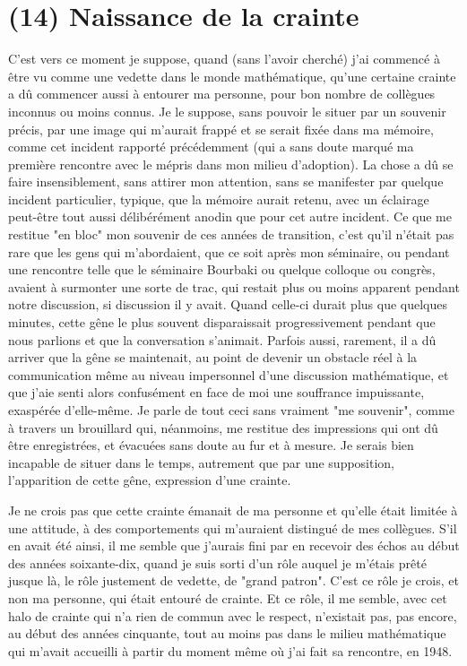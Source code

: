 \section{(14) Naissance de la crainte}

C'est vers ce moment je suppose, quand (sans l'avoir cherché) j'ai commencé à être vu comme une vedette dans le monde mathématique, qu'une certaine crainte a dû commencer aussi à entourer ma personne, pour bon nombre de collègues inconnus ou moins connus. Je le suppose, sans pouvoir le situer par un souvenir précis, par une image qui m'aurait frappé et se serait fixée dans ma mémoire, comme cet incident rapporté précédemment (qui a sans doute marqué ma première rencontre avec le mépris dans mon milieu d'adoption). La chose a dû se faire insensiblement, sans attirer mon attention, sans se manifester par quelque incident particulier, typique, que la mémoire aurait retenu, avec un éclairage peut-être tout aussi délibérément anodin que pour cet autre incident. Ce que me restitue "en bloc" mon souvenir de ces années de transition, c'est qu'il n'était pas rare que les gens qui m'abordaient, que ce soit après mon séminaire, ou pendant une rencontre telle que le séminaire Bourbaki ou quelque colloque ou congrès, avaient à surmonter une sorte de trac, qui restait plus ou moins apparent pendant notre discussion, si discussion il y avait. Quand celle-ci durait plus que quelques minutes, cette gêne le plus souvent disparaissait progressivement pendant que nous parlions et que la conversation s'animait. Parfois aussi, rarement, il a dû arriver que la gêne se maintenait, au point de devenir un obstacle réel à la communication même au niveau impersonnel d'une discussion mathématique, et que j'aie senti alors confusément en face de moi une souffrance impuissante, exaspérée d'elle-même. Je parle de tout ceci sans vraiment "me souvenir", comme à travers un brouillard qui, néanmoins, me restitue des impressions qui ont dû être enregistrées, et évacuées sans doute au fur et à mesure. Je serais bien incapable de situer dans le temps, autrement que par une supposition, l'apparition de cette gêne, expression d'une crainte.

Je ne crois pas que cette crainte émanait de ma personne et qu'elle était limitée à une attitude, à des comportements qui m'auraient distingué de mes collègues. S'il en avait été ainsi, il me semble que j'aurais fini par en recevoir des échos au début des années soixante-dix, quand je suis sorti d'un rôle auquel je m'étais prêté jusque là, le rôle justement de vedette, de "grand patron". C’est ce rôle je crois, et non ma personne, qui était entouré de crainte. Et ce rôle, il me semble, avec cet halo de crainte qui n'a rien de commun avec le respect, n'existait pas, pas encore, au début des années cinquante, tout au moins pas dans le milieu mathématique qui m'avait accueilli à partir du moment même où j'ai fait sa rencontre, en 1948.

